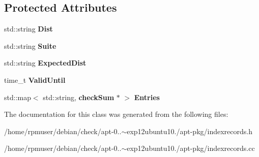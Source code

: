 \subsection*{\-Protected \-Attributes}
\begin{DoxyCompactItemize}
\item 
std\-::string {\bfseries \-Dist}\label{classindexRecords_a33081b77174947a0be46935e0defd3c5}

\item 
std\-::string {\bfseries \-Suite}\label{classindexRecords_a283df0e74e9dc749a4270bca1f132f27}

\item 
std\-::string {\bfseries \-Expected\-Dist}\label{classindexRecords_a2f188246ad92053727c4e6e6e215ef17}

\item 
time\-\_\-t {\bfseries \-Valid\-Until}\label{classindexRecords_aa699673f2c2f7bc7a02eb5784bd14efd}

\item 
std\-::map$<$ std\-::string, {\bf check\-Sum} $\ast$ $>$ {\bfseries \-Entries}\label{classindexRecords_ac95ce47c30383ce5d50ed834b9e198f7}

\end{DoxyCompactItemize}


\-The documentation for this class was generated from the following files\-:\begin{DoxyCompactItemize}
\item 
/home/rpmuser/debian/check/apt-\/0..$\sim$exp12ubuntu10./apt-\/pkg/indexrecords.\-h\item 
/home/rpmuser/debian/check/apt-\/0..$\sim$exp12ubuntu10./apt-\/pkg/indexrecords.\-cc\end{DoxyCompactItemize}
